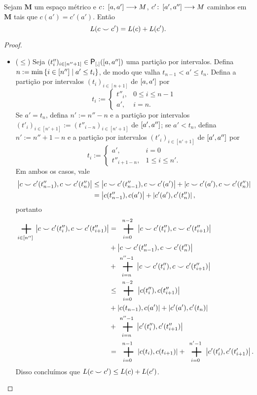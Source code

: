 \begin{proposition}
Sejam $\bm M$ um espaço métrico e $c\colon \allowbreak \left[a,\allowbreak a'\right] \longrightarrow M$, $c'\colon \allowbreak \left[a',\allowbreak a''\right] \longrightarrow M$ caminhos em $\bm M$ tais que $c(a') = c'(a')$. Então
	\begin{equation*}
	L(c \smile c') = L(c) + L(c').
	\end{equation*}
\end{proposition}
\begin{proof}
	\begin{itemize}
	\item ($\leq$) Seja $(t''_i)_{i \in [n''+1]} \in \Partinter(\intff{a}{a''})$ uma partição por intervalos. Defina $n := \min\left\{ i \in [n''] \;\middle\vert\; a' \leq t_i \right\}$, de modo que valha $t_{n-1} < a' \leq t_n$. Defina a partição por intervalos $(t_i)_{i \in [n+1]}$ de $\left[a,\allowbreak a'\right]$ por
		\begin{equation*}
		t_i := \begin{cases}
				t''_i,	& 0 \leq i \leq n-1 \\
				a',		& i = n.
				\end{cases}
		\end{equation*}
	Se $a' = t_n$, defina $n' := n''-n$ e a partição por intervalos $(t'_i)_{i \in [n'+1]} := (t''_{i-n})_{i \in [n'+1]}$ de $\left[a',\allowbreak a''\right]$; se $a' < t_n$, defina $n' := n''+1-n$ e a partição por intervalos $(t'_i)_{i \in [n'+1]}$ de $\left[a',\allowbreak a''\right]$ por
		\begin{equation*}
		t_i := \begin{cases}
				a',				& i=0 \\
				t''_{i+1-n},	& 1 \leq i \leq n'.
				\end{cases}
		\end{equation*}
	Em ambos os casos, vale
		\begin{align*}
		\left\vert{c \smile c'(t''_{n-1})},{c \smile c'(t''_n)}\right\vert &\leq \left\vert{c \smile c'(t''_{n-1})},{c \smile c'(a')}\right\vert + \left\vert{c \smile c'(a')},{c \smile c'(t''_n)}\right\vert \\
			&= \left\vert{c(t''_{n-1})},{c(a')}\right\vert + \left\vert{c'(a')},{c'(t''_n)}\right\vert,
		\end{align*}
	portanto
		\begin{align*}
		\sum_{i \in [n'']} \dist{c \conca c'(t''_i)}{c \conca c'(t''_{i+1})} &= \sum_{i=0}^{n-2} \dist{c \conca c'(t''_i)}{c \conca c'(t''_{i+1})} \\
			&+ \dist{c \conca c'(t''_{n-1})}{c \conca c'(t''_n)} \\
			&+ \sum_{i=n}^{n''-1} \dist{c \conca c'(t''_i)}{c \conca c'(t''_{i+1})} \\
			&\leq \sum_{i=0}^{n-2} \dist{c(t''_i)}{c(t''_{i+1})} \\
			&+ \dist{c(t_{n-1})}{c(a')} + \dist{c'(a')}{c'(t_n)} \\
			&+ \sum_{i=n}^{n''-1} \dist{c'(t''_i)}{c'(t''_{i+1})} \\
			&= \sum_{i=0}^{n-1} \dist{c(t_i)}{c(t_{i+1})} + \sum_{i=0}^{n'-1} \dist{c'(t'_i)}{c'(t'_{i+1})}.
		\end{align*}
	Disso concluímos que $L(c \smile c') \leq L(c) + L(c')$.


\end{itemize}
\end{proof}
